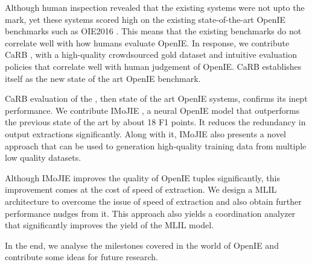 Although human inspection revealed that the existing systems were not upto the mark, yet these systems scored high on the existing state-of-the-art OpenIE benchmarks such as OIE2016 \citep{OIE2016}. This means that the existing benchmarks do not correlate well with how humans evaluate OpenIE. In response, we contribute CaRB \citep{bhardwaj&al19}, with a high-quality crowdsourced gold dataset and intuitive evaluation policies that correlate well with human judgement of OpenIE. CaRB establishes itself as the new state of the art OpenIE benchmark.

CaRB evaluation of the \citet{cui&al18}, then state of the art OpenIE systems, confirms its inept performance. We contribute IMoJIE \citep{kolluru&al20}, a neural OpenIE model that outperforms the previous state of the art by about 18 F1 points. It reduces the redundancy in output extractions significantly. Along with it, IMoJIE also presents a novel approach that can be used to generation high-quality training data from multiple low quality datasets.

Although IMoJIE improves the quality of OpenIE tuples significantly, this improvement comes at the cost of speed of extraction. We design a MLIL architecture to overcome the issue of speed of extraction and also obtain further performance nudges from it. This approach also yields a coordination analyzer that significantly improves the yield of the MLIL model.

In the end, we analyse the milestones covered in the world of OpenIE and contribute some ideas for future research.
